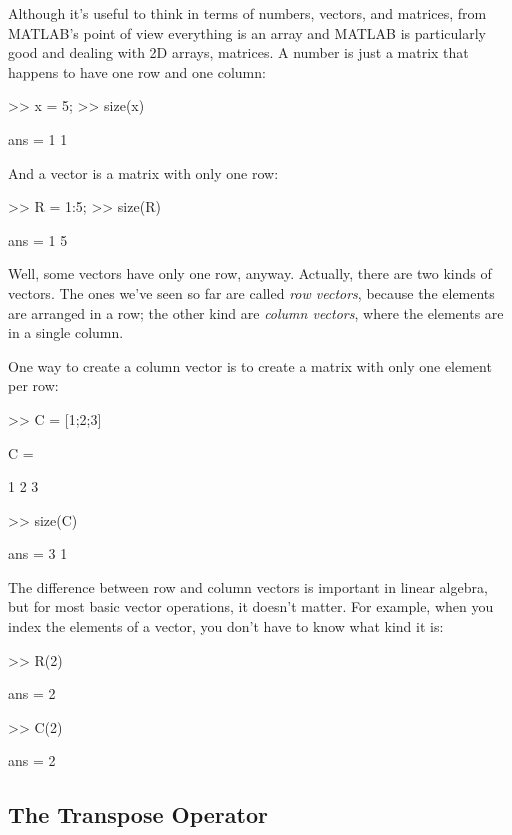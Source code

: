 \documentclass[../../book.tex]{subfiles}
\begin{document}

Although it's useful to think in terms of numbers, vectors, and matrices,
from MATLAB's point of view everything is an array and MATLAB is particularly good and dealing with 2D arrays, matrices.  A number
is just a matrix that happens to have one row and one column:

\begin{code}
>> x = 5;
>> size(x)

ans = 1     1
\end{code}

And a vector is a matrix with only one row:

\begin{code}
>> R = 1:5;
>> size(R)

ans = 1     5
\end{code}

Well, some vectors have only one row, anyway.  Actually, there are two kinds
of vectors.  The ones we've seen so far are called \emph{row vectors},
because the elements are arranged in a row; the other kind are
\emph{column vectors}, where the elements are in a single column.

One way to create a column vector is to create a matrix with only
one element per row:

\begin{code}
>> C = [1;2;3]

C =

     1
     2
     3

>> size(C)

ans = 3     1
\end{code}

The difference between row and column vectors is important in
linear algebra, but for most basic vector operations, it doesn't matter.
For example, when you index the elements of a vector, you don't have to know what kind
it is:


\begin{code}
>> R(2)

ans = 2

>> C(2)

ans = 2
\end{code}


\subsection{The Transpose Operator}
\end{document}
